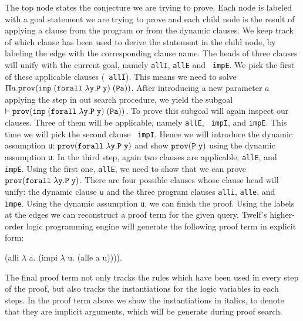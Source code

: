\documentclass{acmconf}
\newcommand{\mygray}{\color{green}}
\newcommand{\pfLF}{\tt{prov}}
\newcommand{\impLF}{\tt{imp}\;}
\newcommand{\forallLF}{\tt{forall}\;}
\newcommand{\vd}{\vdash}
\begin{document}
The top node states the conjecture we are trying to prove. 
Each node is labeled with a goal statement we are trying to prove and
each child node is the result of applying a clause from the program or
from the dynamic clauses. We keep track of which clause has been used
to derive the statement in the child node, by labeling the edge with
the corresponding clause name. The heads of three clauses will unify
with the current goal, namely {\tt allI}, {\tt allE} and {\tt
  impE}. We pick the first of these applicable clauses ({\tt
  allI}). This means we need to solve $\Pi a. \pfLF ( \impLF
(\forallLF \lambda y. P\; y)\; (P a))$. After introducing a new
parameter $a$ applying the {} step in out search
procedure, we yield the subgoal $\vd \pfLF ( \impLF (\forallLF \lambda
y. P\; y)\; (P a))$. To prove this subgoal will again inspect our
clauses. Three of them will be applicable, namely {\tt allE}, {\tt
  impI}, and {\tt impE}. This time we will pick the second clause {\tt
  impI}. Hence we will introduce the dynamic assumption {\tt{u}}$ :
\pfLF (\forallLF \lambda y. P\; y)$ and show $\pfLF (P\; y)$ using the
dynamic assumption {\tt{u}}. In the third step, 
again two clauses are applicable,  {\tt allE}, and {\tt
  impE}. Using the first one, {\tt allE}, we need to show that we can
prove $\pfLF (\forallLF \lambda y. P\; y)$. There are four
possible clauses whose clause head will unify: the dynamic clause
{\tt u} and the three program clauses {\tt alli}, {\tt alle}, and {\tt
  impe}. Using the dynamic assumption {\tt u}, we can finish the
proof. Using the labels at the edges we can reconstruct a proof term
for the given query. Twelf's higher-order logic programming engine
will generate the following proof term in explicit form:

\begin{code}
(alli {\mygray{($\lambda\!\!$ x. ((forall $\lambda\!\!$ y. P y) imp P x))}}
   $\lambda\!\!$ a. (impi {\mygray{(forall $\lambda\!\!$ y.P y) (P a)}}
           $\lambda\!\!$ u. (alle {\mygray{($\lambda\!\!$ y.P y)}} a u)))).
\end{code}

The final proof term not only tracks the rules which have been used in
every step of the proof, but also tracks the instantiations for the logic
variables in each steps. In the proof term above we show the
instantiations in italics, to denote that they are implicit arguments,
which will be generate during proof search.
\end{document}
